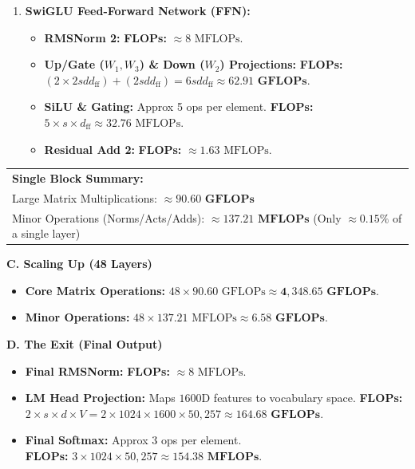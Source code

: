 \begin{answerbox}
\begin{enumerate}
        \item \textbf{SwiGLU Feed-Forward Network (FFN):}
              \begin{itemize}[itemsep=0.2em, parsep=0pt, topsep=0.2em]
                  \item \textbf{RMSNorm 2:} \textbf{FLOPs:} $\approx 8 \text{ MFLOPs}$.
                  \item \textbf{Up/Gate ($W_1, W_3$) \& Down ($W_2$) Projections:} \newline \textbf{FLOPs:} $(2 \times 2sdd_{\mathrm{ff}}) + (2sdd_{\mathrm{ff}}) = 6sdd_{\mathrm{ff}} \approx \mathbf{62.91 \text{ GFLOPs}}$.
                  \item \textbf{SiLU \& Gating:} Approx 5 ops per element. \textbf{FLOPs:} $5 \times s \times d_{\mathrm{ff}} \approx 32.76 \text{ MFLOPs}$.
                  \item \textbf{Residual Add 2:} \textbf{FLOPs:} $\approx 1.63 \text{ MFLOPs}$.
              \end{itemize}
    \end{enumerate}

    \begin{tabular}{@{}l@{}}
        \textbf{Single Block Summary:}                                        \\
        Large Matrix Multiplications: $\approx \mathbf{90.60 \text{ GFLOPs}}$ \\
        Minor Operations (Norms/Acts/Adds): $\approx \mathbf{137.21 \text{ MFLOPs}}$ (Only $\approx 0.15\%$ of a single layer)
    \end{tabular}

    \vspace{1em}
    \textbf{C. Scaling Up (48 Layers)}
    \begin{itemize}[itemsep=0.5em, parsep=0pt, topsep=0.5em]
        \item \textbf{Core Matrix Operations:} $48 \times 90.60 \text{ GFLOPs} \approx \mathbf{4,348.65 \text{ GFLOPs}}$.
        \item \textbf{Minor Operations:} $48 \times 137.21 \text{ MFLOPs} \approx \mathbf{6.58 \text{ GFLOPs}}$.
    \end{itemize}

    \vspace{1em}
    \textbf{D. The Exit (Final Output)}
    \begin{itemize}[itemsep=0.5em, parsep=0pt, topsep=0.5em]
        \item \textbf{Final RMSNorm:} \textbf{FLOPs:} $\approx 8 \text{ MFLOPs}$.
        \item \textbf{LM Head Projection:} Maps $1600$D features to vocabulary space. \newline \textbf{FLOPs:} $2 \times s \times d \times V = 2 \times 1024 \times 1600 \times 50,257 \approx \mathbf{164.68 \text{ GFLOPs}}$.
        \item \textbf{Final Softmax:} Approx 3 ops per element. \\
              \textbf{FLOPs:} $3 \times 1024 \times 50,257 \approx \mathbf{154.38 \text{ MFLOPs}}$.
    \end{itemize}


\end{answerbox}
